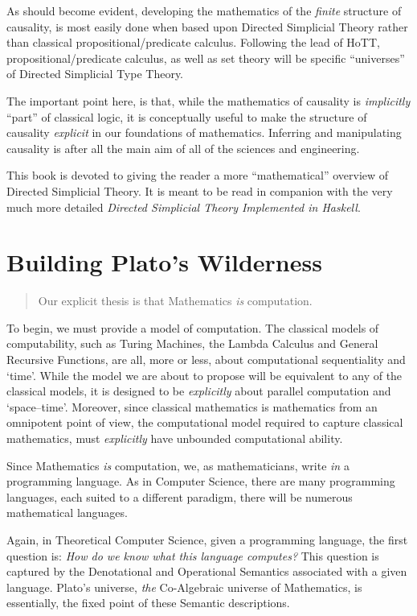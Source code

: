 \documentclass[a4paper,openany]{amsbook}
\newenvironment{myQuote}{\begin{quotation}}{\end{quotation}}
\begin{document}
As should become evident, developing the mathematics of the \emph{finite}
structure of causality, is most easily done when based upon Directed Simplicial
Theory rather than classical propositional/predicate calculus. Following the
lead of HoTT, propositional/predicate calculus, as well as set theory will be
specific ``universes'' of Directed Simplicial Type Theory.

The important point here, is that, while the mathematics of causality is
\emph{implicitly} ``part'' of classical logic, it is conceptually useful to make
the structure of causality \emph{explicit} in our foundations of mathematics. 
Inferring and manipulating causality is after all the main aim of all of the
sciences and engineering.

This book is devoted to giving the reader a more ``mathematical'' overview of
Directed Simplicial Theory.  It is meant to be read in companion with the very
much more detailed \textit{Directed Simplicial Theory Implemented in Haskell}.

\section{Building Plato's Wilderness}

\begin{myQuote}
Our explicit thesis is that Mathematics \emph{is} computation.
\end{myQuote}

To begin, we must provide a model of computation. The classical models of
computability, such as Turing Machines, the Lambda Calculus and General
Recursive Functions, are all, more or less, about computational sequentiality
and `time'. While the model we are about to propose will be equivalent to any of
the classical models, it is designed to be \emph{explicitly} about parallel
computation and `space--time'. Moreover, since classical mathematics is
mathematics from an omnipotent point of view, the computational model required
to capture classical mathematics, must \emph{explicitly} have unbounded
computational ability.

Since Mathematics \emph{is} computation, we, as mathematicians, write \emph{in}
a programming language. As in Computer Science, there are many programming
languages, each suited to a different paradigm, there will be numerous
mathematical languages.

Again, in Theoretical Computer Science, given a programming language, the first
question is: \emph{How do we know what this language computes?} This question is
captured by the Denotational and Operational Semantics associated with a given
language. Plato's universe, \emph{the} Co-Algebraic universe of Mathematics,
is essentially, the fixed point of these Semantic descriptions.
\end{document}
